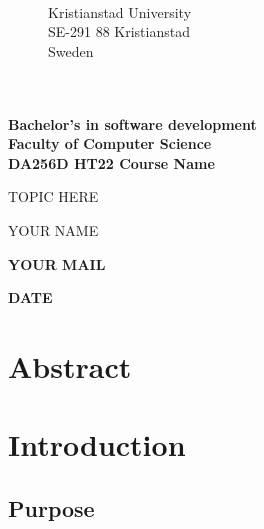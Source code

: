 \documentclass{article}
\begin{document}
	
	\begin{figure}[h!]
			\\
			\small
			Kristianstad University\\
			SE-291 88 Kristianstad\\
			Sweden\\
			\href{tel:+46 44 20 30 00}{\color{black}{+46 44 20 30 00}}\\
			\textbf{\href{www.hkr.se}{\color{HKR}{www.hkr.se}{}}}
		\endminipage
	\end{figure}
	
	\vspace{0.8cm}
	\Large

	\textbf{\\
	Bachelor’s in software development\\
	Faculty of Computer Science\\
	DA256D HT22 Course Name}  %
	\begin{center}
	\vspace{3cm}
	\Huge
	
	TOPIC HERE
	
	\vspace{2cm}
	\LARGE
	YOUR NAME
	
	\vspace{0.4cm}	
	\large
	\textbf{YOUR MAIL}		\vspace{0.9cm}	

    \textbf{DATE}
	\end{center}
	
\thispagestyle{empty}       %

\newpage
	





\tableofcontents
\large

\thispagestyle{empty}        %


\newpage 

\section*{Abstract}
\thispagestyle{empty}        %

\newpage
\section{Introduction}
\vspace{1cm}
\subsection{Purpose}
\end{document}
